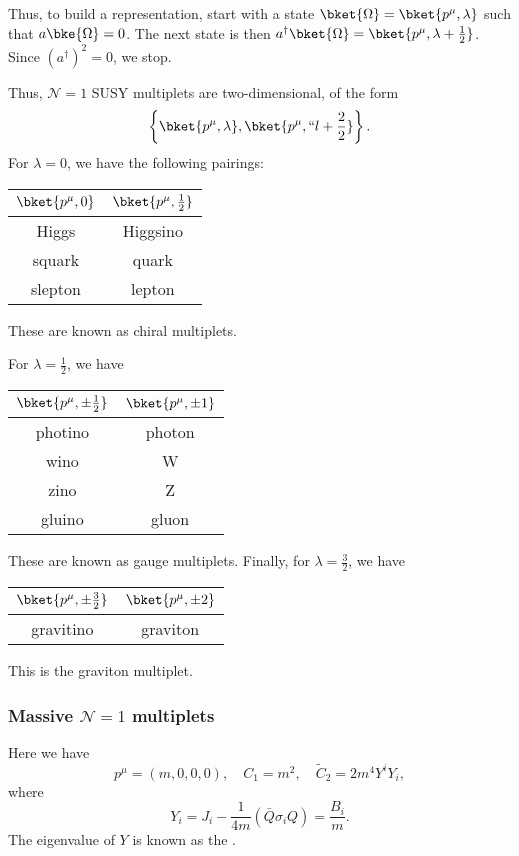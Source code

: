 \documentclass[a4paper]{article}
\begin{document}
Thus, to build a representation, start with a state $\bket{\Omega} = \bket{p^\mu, \lambda}$ such that $a \bke{\Omega} = 0$. The next state is then $a^\dagger \bket{\Omega} = \bket{p^\mu, \lambda + \frac{1}{2}}$. Since $(a^\dagger)^2 = 0$, we stop. %

Thus, $\mathcal{N} = 1$ SUSY multiplets are two-dimensional, of the form %
\[
  \left\{\bket{p^\mu, \lambda}, \bket{p^\mu, ``l + \frac{2}{2}}\right\}.
\]
For $\lambda = 0$, we have the following pairings:
\begin{center}
  \begin{tabular}{cc}
    \toprule
    $\bket{p^{\mu}, 0}$ & $\bket{p^\mu, \frac{1}{2}}$\\
    \midrule
    Higgs & Higgsino\\
    squark & quark\\
    slepton & lepton\\
    \bottomrule
  \end{tabular}
\end{center}
These are known as chiral multiplets.

For $\lambda = \frac{1}{2}$, we have
\begin{center}
  \begin{tabular}{cc}
    \toprule
    $\bket{p^{\mu}, \pm \frac{1}{2}}$ & $\bket{p^\mu, \pm 1}$\\
    \midrule
    photino & photon\\
    wino & W\\
    zino & Z\\
    gluino & gluon\\ %
    \bottomrule
  \end{tabular}
\end{center}
These are known as gauge multiplets. Finally, for $\lambda = \frac{3}{2}$, we have
\begin{center}
  \begin{tabular}{cc}
    \toprule
    $\bket{p^{\mu}, \pm \frac{3}{2}}$ & $\bket{p^\mu, \pm 2}$\\
    \midrule
    gravitino & graviton
    \bottomrule
  \end{tabular}
\end{center}
This is the graviton multiplet.

\subsubsection*{Massive $\mathcal{N}=1$ multiplets}
Here we have
\[
  p^\mu = (m, 0, 0, 0),\quad C_1 = m^2,\quad \tilde{C}_2 = 2m^4 Y^i Y_i,
\]
where
\[
  Y_i = J_i - \frac{1}{4m} (\bar{Q} \sigma_i Q) = \frac{B_i}{m}.
\]
The eigenvalue of $Y$ is known as the .
\end{document}
